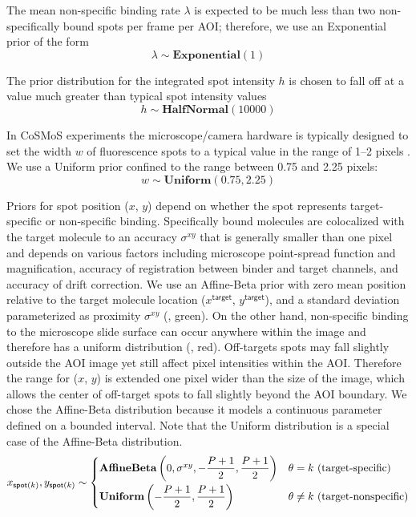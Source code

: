 The mean non-specific binding rate $\lambda$ is expected to be much less than two non-specifically bound spots per frame per AOI; therefore, we use an Exponential prior of the form
%
\begin{equation}
    \lambda \sim \mathbf{Exponential}(1)
\end{equation}

The prior distribution for the integrated spot intensity $h$ is chosen to fall off at a value much greater than typical spot intensity values 
%
\begin{equation}
    h \sim \mathbf{HalfNormal}(10000)
\end{equation}

In CoSMoS experiments the microscope/camera hardware is typically designed to set the width $w$ of fluorescence spots to a  typical value in the range of 1--2 pixels \citep{Ober2015-ba}. We use a Uniform prior confined to the range between 0.75 and 2.25 pixels:
%
\begin{equation}
    w \sim \mathbf{Uniform}(0.75, 2.25)
\end{equation}

Priors for spot position ($x$, $y$) depend on whether the spot represents target-specific or non-specific binding. Specifically bound molecules are colocalized with the target molecule to an accuracy $\sigma^{xy}$ that is generally smaller than one pixel and depends on various factors including microscope point-spread function and magnification, accuracy of registration between binder and target channels, and accuracy of drift correction. We use an Affine-Beta prior with zero mean position relative to the target molecule location ($x^\mathsf{target}$, $y^\mathsf{target}$), and a standard deviation parameterized as proximity $\sigma^{xy} $ (, green). On the other hand, non-specific binding to the microscope slide surface can occur anywhere within the image and therefore has a uniform distribution (, red).  Off-targets spots may fall slightly outside the AOI image yet still affect pixel intensities within the AOI.  Therefore the range for ($x$, $y$) is extended one pixel wider than the size of the image, which allows the center of off-target spots to fall slightly beyond the AOI boundary. We chose the Affine-Beta distribution because it models a continuous parameter defined on a bounded interval. Note that the Uniform distribution is a special case of the Affine-Beta distribution.
%
\begin{equation}
    x_{\mathsf{spot}(k)}, y_{\mathsf{spot}(k)} \sim
    \begin{cases}
        \mathbf{AffineBeta}\left( 0, \sigma^{xy}, -\dfrac{P+1}{2}, \dfrac{P+1}{2} \right) & \theta = k ~\textrm{(target-specific)} \\
        \mathbf{Uniform}\left(-\dfrac{P+1}{2}, \dfrac{P+1}{2} \right) & \theta \neq k ~\text{(target-nonspecific)} \rule{0pt}{4ex}
    \end{cases}
\end{equation}

